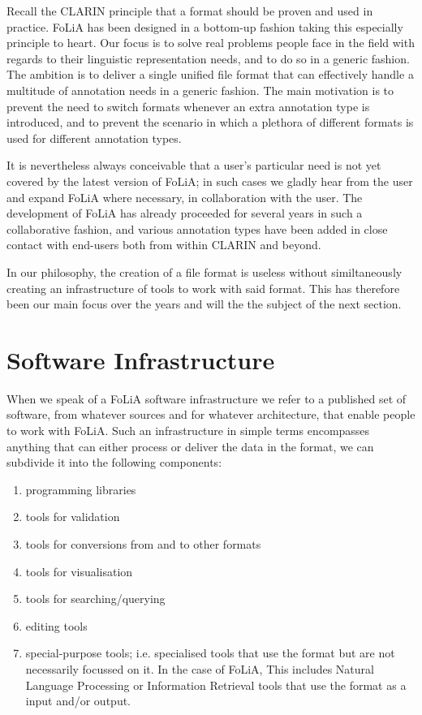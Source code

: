\documentclass[a4paper,10pt,twoside]{article}
\begin{document}
Recall the CLARIN principle that a format should be proven and used in
practice. FoLiA has been designed in a bottom-up fashion taking this especially
principle to heart. Our focus is to solve real problems people face in the
field with regards to their linguistic representation needs, and to do so in a
generic fashion. The ambition is to deliver a single unified file format that
can effectively handle a multitude of annotation needs in a generic fashion.
The main motivation is to prevent the need to switch formats whenever an extra
annotation type is introduced, and to prevent the scenario in which a plethora
of different formats is used for different annotation types.

It is nevertheless always conceivable that a user's particular need is not yet
covered by the latest version of FoLiA; in such cases we gladly hear from the
user and expand FoLiA where necessary, in collaboration with the user. The
development of FoLiA has already proceeded for several years in such a
collaborative fashion, and various annotation types have been added in close
contact with end-users both from within CLARIN and beyond.

In our philosophy, the creation of a file format is useless without
similtaneously creating an infrastructure of tools to work with said format.
This has therefore been our main focus over the years and will the the subject
of the next section.

\section{Software Infrastructure}
\label{sec:softwareinfrastructure}

When we speak of a FoLiA software infrastructure we refer to a published set of
software, from whatever sources and for whatever architecture, that enable
people to work with FoLiA. Such an infrastructure in simple terms encompasses
anything that can either process or deliver the data in the format, we can
subdivide it into the following components:

\begin{enumerate}
\item programming libraries
\item tools for validation
\item tools for conversions from and to other formats
\item tools for visualisation
\item tools for searching/querying
\item editing tools
\item special-purpose tools; i.e. specialised tools that use the format but are
    not necessarily focussed on it. In the case of FoLiA, This includes Natural
    Language Processing or Information Retrieval tools that use the format as a
    input and/or output.
\end{enumerate}
\end{document}
